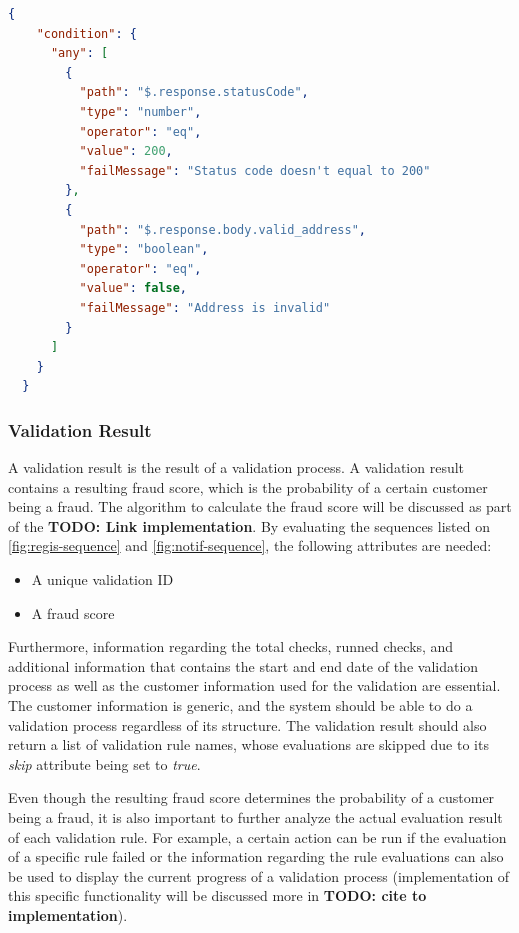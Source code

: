 \begin{lstlisting}[caption={Validation rule \textbf{condition} attribute example with ANY condition (JSON)}, language=json]
  {
    "condition": {
      "any": [
        {
          "path": "$.response.statusCode",
          "type": "number",
          "operator": "eq",
          "value": 200,
          "failMessage": "Status code doesn't equal to 200"
        },
        {
          "path": "$.response.body.valid_address",
          "type": "boolean",
          "operator": "eq",
          "value": false,
          "failMessage": "Address is invalid"
        }
      ]
    }
  }
\end{lstlisting}

\subsubsection{Validation Result}

A validation result is the result of a validation process. A validation result contains a resulting fraud score, which is the probability of a certain customer being a fraud. The algorithm to calculate the fraud score will be discussed as part of the \textbf{TODO: Link implementation}.
By evaluating the sequences listed on \autoref{fig:regis-sequence} and \autoref{fig:notif-sequence}, the following attributes are needed:

\begin{itemize}
  \item A unique validation ID
  \item A fraud score 
\end{itemize}

Furthermore, information regarding the total checks, runned checks, and additional information that contains the start and end date of the validation process as well as the customer information used for the validation are essential. The customer information is generic, and the system should be able to do a validation process regardless of its structure. The validation result should also return a list of validation rule names, whose evaluations are skipped due to its \emph{skip} attribute being set to \emph{true}.

Even though the resulting fraud score determines the probability of a customer being a fraud, it is also important to further analyze the actual evaluation result of each validation rule. For example, a certain action can be run if the evaluation of a specific rule failed or the information regarding the rule evaluations can also be used to display the current progress of a validation process (implementation of this specific functionality will be discussed more in \textbf{TODO: cite to implementation}). 

